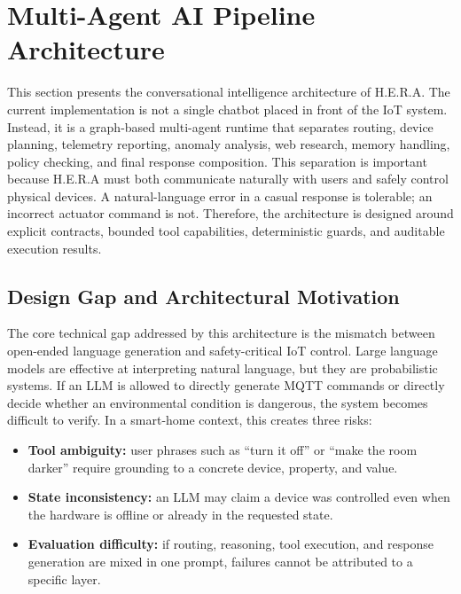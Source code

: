 \newpage
\section{Multi-Agent AI Pipeline Architecture}
\label{sec:multi-agent}

This section presents the conversational intelligence architecture of H.E.R.A. The current implementation is not a single chatbot placed in front of the IoT system. Instead, it is a graph-based multi-agent runtime that separates routing, device planning, telemetry reporting, anomaly analysis, web research, memory handling, policy checking, and final response composition. This separation is important because H.E.R.A must both communicate naturally with users and safely control physical devices. A natural-language error in a casual response is tolerable; an incorrect actuator command is not. Therefore, the architecture is designed around explicit contracts, bounded tool capabilities, deterministic guards, and auditable execution results.

\subsection{Design Gap and Architectural Motivation}

The core technical gap addressed by this architecture is the mismatch between open-ended language generation and safety-critical IoT control. Large language models are effective at interpreting natural language, but they are probabilistic systems. If an LLM is allowed to directly generate MQTT commands or directly decide whether an environmental condition is dangerous, the system becomes difficult to verify. In a smart-home context, this creates three risks:

\begin{itemize}[leftmargin=*, itemsep=2pt]
    \item \textbf{Tool ambiguity:} user phrases such as ``turn it off'' or ``make the room darker'' require grounding to a concrete device, property, and value.
    \item \textbf{State inconsistency:} an LLM may claim a device was controlled even when the hardware is offline or already in the requested state.
    \item \textbf{Evaluation difficulty:} if routing, reasoning, tool execution, and response generation are mixed in one prompt, failures cannot be attributed to a specific layer.
\end{itemize}


